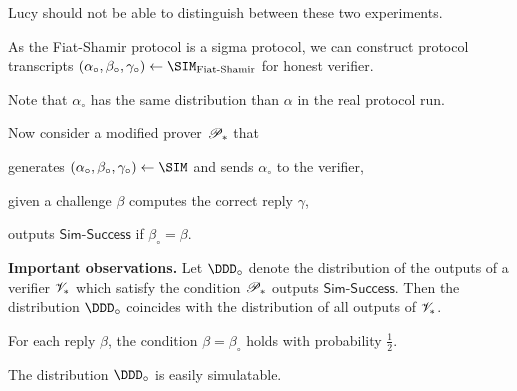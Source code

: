 \documentclass[landscape,dvips,footrule]{foils}
\begin{document}


Lucy should not be able to distinguish between these two experiments.




\begin{triangles}
\item As the Fiat-Shamir protocol is a sigma protocol, we can
  construct protocol transcripts
  $(\alpha_\circ,\beta_\circ,\gamma_\circ)\gets\SIM_{\text{Fiat\text{-}Shamir}}$ for honest
  verifier.
\item Note that $\alpha_\circ$ has the same distribution than
  $\alpha$ in the real protocol run.
\item Now consider a modified prover $\mathscr{P}_*$ that
  \begin{diamonds}
    \item  generates $(\alpha_\circ,\beta_\circ,\gamma_\circ)\gets\SIM$ and sends $\alpha_\circ$ to the verifier,
    \item  given a challenge $\beta$ computes the correct reply $\gamma$,
    \item  outputs $\mathsf{Sim\text{-}Success}$ if $\beta_\circ=\beta$. 
  \end{diamonds}
\end{triangles}
\Bigskip

\textbf{Important observations.}  Let $\DDD_\circ$ denote the distribution
of the outputs of a verifier $\mathscr{V}_*$ which satisfy the condition
$\mathscr{P}_*$ outputs $\mathsf{Sim\text{-}Success}$. Then the
distribution $\DDD_\circ$ coincides with the distribution of all 
outputs of $\mathscr{V}_*$.
\begin{triangles}
  \item For each reply $\beta$, the condition $\beta=\beta_\circ$ holds with probability $\frac{1}{2}$.
  \item The distribution $\DDD_\circ$ is easily simulatable.
\end{triangles}


\vspace*{-2cm}
\end{document}
